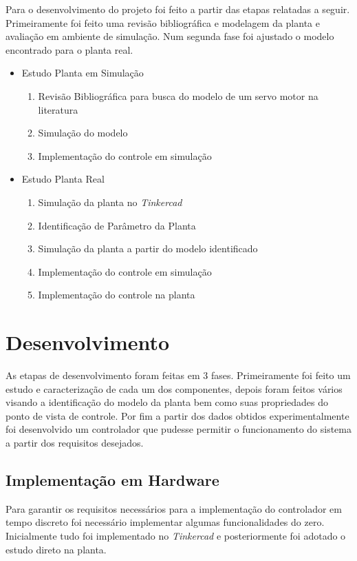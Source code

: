 \documentclass[a4paper,11pt]{article}
\begin{document}
Para o desenvolvimento do projeto foi feito a partir das etapas relatadas a seguir. Primeiramente foi feito uma revisão bibliográfica e modelagem da planta e avaliação em ambiente de simulação. Num segunda fase foi ajustado o modelo encontrado para o planta real.

\begin{itemize}
    \item Estudo Planta em Simulação
    \begin{enumerate}
        \item Revisão Bibliográfica para busca do modelo de um servo motor na literatura
        \item Simulação do modelo
        \item Implementação do controle em simulação
    \end{enumerate}
    \item Estudo Planta Real
    \begin{enumerate}
        \item Simulação da planta no \textit{Tinkercad}
        \item Identificação de Parâmetro da Planta
        \item Simulação da planta a partir do modelo identificado
        \item Implementação do controle em simulação
        \item Implementação do controle na planta
    \end{enumerate}
\end{itemize}

\section{Desenvolvimento}

As etapas de desenvolvimento foram feitas em 3 fases. Primeiramente foi feito um estudo e caracterização de cada um dos componentes, depois foram feitos vários visando a identificação do modelo da planta bem como suas propriedades do ponto de vista de controle. Por fim a partir dos dados obtidos experimentalmente foi desenvolvido um controlador que pudesse permitir o funcionamento do sistema a partir dos requisitos desejados.

\subsection{Implementação em Hardware}

Para garantir os requisitos necessários para a implementação do controlador em tempo discreto foi necessário implementar algumas funcionalidades do zero. Inicialmente tudo foi implementado no \textit{Tinkercad} e posteriormente foi adotado o estudo direto na planta.
\end{document}
